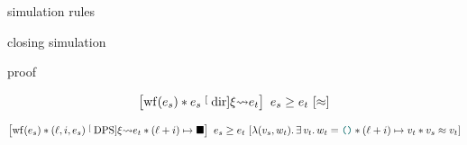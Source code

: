 
simulation rules





%

closing simulation

proof


\begin{theorem}
    \[
        \iCsimvHoare{
            \wf{e_s} \iSep
            e_s \tmcDir{\xi} e_t
        }{
            \iSimilar
        }{
            e_s
        }{
            e_t
        }
    \]
\end{theorem}

\begin{theorem}
    \[
        \iCsimvHoare{
            \wf{e_s} \iSep
            (\loc, i, e_s) \tmcDps{\xi} e_t \iSep
            (\loc + i) \mapsto \lambdHole
        }{
            \lambdaAbs (v_s, w_t) \ldotp
            \exists v_t \ldotp
            w_t = \lambdUnit \iSep
            (\loc + i) \mapsto v_t \iSep
            v_s \iSimilar v_t
        }{
            e_s
        }{
            e_t
        }
    \]
\end{theorem}


